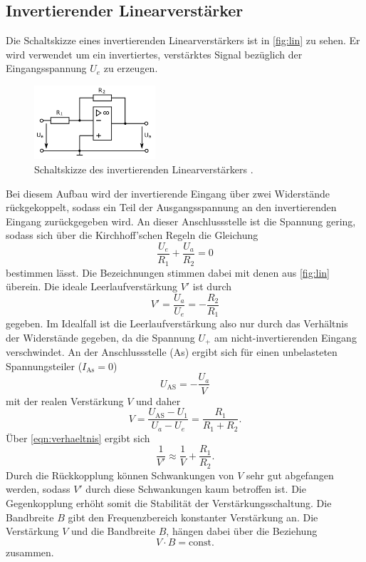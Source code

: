 \subsection{Invertierender Linearverstärker}
Die Schaltskizze eines invertierenden Linearverstärkers ist in \autoref{fig:lin} zu sehen. Er wird 
verwendet um ein invertiertes, verstärktes Signal bezüglich der Eingangsspannung $U_e$ zu erzeugen.
\begin{figure}[H]
    \centering
    \includegraphics[width=0.4\textwidth]{linear.png}
    \caption{Schaltskizze des invertierenden Linearverstärkers \cite{anleitung}.}
    \label{fig:lin}
\end{figure}
Bei diesem Aufbau wird der invertierende Eingang über zwei Widerstände rückgekoppelt,
sodass ein Teil der 
Ausgangsspannung an den invertierenden Eingang zurückgegeben wird. An dieser Anschlussstelle 
ist die Spannung gering, sodass sich über die Kirchhoff'schen Regeln die Gleichung 
\begin{equation*}
    \frac{U_e}{R_1} + \frac{U_a}{R_2} = 0
\end{equation*}
bestimmen lässt. Die Bezeichnungen stimmen dabei mit denen aus \autoref{fig:lin} überein.
Die ideale Leerlaufverstärkung $V'$ ist durch 
\begin{equation}
    \label{eqn:verhaeltnis}
    V' = \frac{U_a}{U_e} = - \frac{R_2}{R_1}
\end{equation}
gegeben. Im Idealfall ist die Leerlaufverstärkung also nur durch das Verhältnis der Widerstände
gegeben, da die Spannung $U_+$ am nicht-invertierenden Eingang verschwindet.
An der Anschlussstelle (As) ergibt sich für einen unbelasteten Spannungsteiler ($I_\text{As}=0$)
\begin{equation*}
    U_\text{AS} = - \frac{U_a}{V}
\end{equation*}
mit der realen Verstärkung $V$ und daher
\begin{equation*}
   V =  \frac{U_\text{AS} - U_1}{U_a - U_e} = \frac{R_1}{R_1 + R_2}.
\end{equation*}   
Über \autoref{eqn:verhaeltnis} ergibt sich
\begin{equation*}
    \frac{1}{V'} \approx \frac{1}{V} + \frac{R_1}{R_2}.
\end{equation*}
Durch die Rückkopplung können Schwankungen von $V$ sehr gut abgefangen werden, sodass 
$V'$ durch diese Schwankungen kaum betroffen ist. Die Gegenkopplung erhöht somit die Stabilität 
der Verstärkungsschaltung.
Die Bandbreite $B$ gibt den Frequenzbereich konstanter Verstärkung an.
Die Verstärkung $V$ und die Bandbreite $B$, hängen dabei über die Beziehung
\begin{equation*}
    V \cdot B = \text{const.}
\end{equation*}
zusammen.

